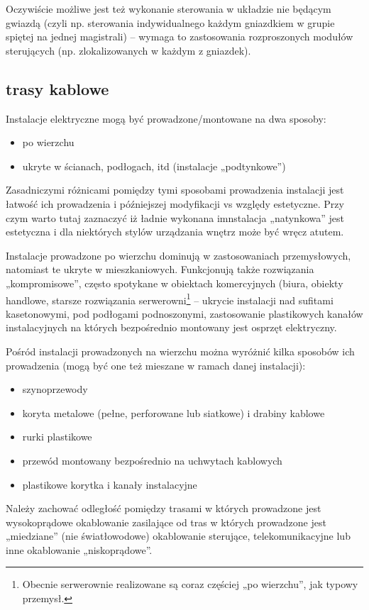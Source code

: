 Oczywiście możliwe jest też wykonanie sterowania w układzie nie będącym gwiazdą (czyli np. sterowania indywidualnego każdym gniazdkiem w grupie spiętej na jednej magistrali) – wymaga to zastosowania rozproszonych modułów sterujących (np. zlokalizowanych w każdym z gniazdek).

\subsection{trasy kablowe}

Instalacje elektryczne mogą być prowadzone/montowane na dwa sposoby:
\begin{itemize}
	\item po wierzchu
	\item ukryte w ścianach, podłogach, itd (instalacje „podtynkowe”)
\end{itemize}

Zasadniczymi różnicami pomiędzy tymi sposobami prowadzenia instalacji jest łatwość ich prowadzenia i późniejszej modyfikacji vs względy estetyczne.
Przy czym warto tutaj zaznaczyć iż ładnie wykonana imnstalacja „natynkowa” jest estetyczna i dla niektórych stylów urządzania wnętrz może być wręcz atutem.

Instalacje prowadzone po wierzchu dominują w zastosowaniach przemysłowych, natomiast te ukryte w mieszkaniowych.
Funkcjonują także rozwiązania „kompromisowe”, często spotykane w obiektach komercyjnych (biura, obiekty handlowe, starsze rozwiązania serwerowni\footnote{Obecnie serwerownie realizowane są coraz częściej „po wierzchu”, jak typowy przemysł.}
	– ukrycie instalacji nad sufitami kasetonowymi, pod podłogami podnoszonymi, zastosowanie plastikowych kanałów instalacyjnych na których bezpośrednio montowany jest osprzęt elektryczny.

Pośród instalacji prowadzonych na wierzchu można wyróżnić kilka sposobów ich prowadzenia (mogą być one też mieszane w ramach danej instalacji):
\begin{itemize}
	\item szynoprzewody
	\item koryta metalowe (pełne, perforowane lub siatkowe) i drabiny kablowe
	\item rurki plastikowe
	\item przewód montowany bezpośrednio na uchwytach kablowych
	\item plastikowe korytka i kanały instalacyjne
\end{itemize}

Należy zachować odległość pomiędzy trasami w których prowadzone jest wysokoprądowe okablowanie zasilające od tras w których prowadzone jest „miedziane” (nie światłowodowe) okablowanie sterujące, telekomunikacyjne lub inne okablowanie „niskoprądowe”.


